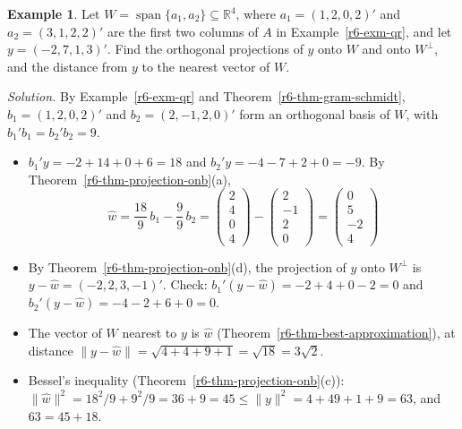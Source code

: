 \documentclass[12pt]{article}
\newcommand{\R}{\mathbb R}
\DeclareMathOperator{\Span}{span}
\theoremstyle{definition}
\newtheorem{example}[theorem]{Example}
\begin{document}
\begin{example}\label{r6-exm-projection-onb}
Let \(W=\Span\{a_1,a_2\}\subseteq\R^4\), where \(a_1=(1,2,0,2)'\) and \(a_2=(3,1,2,2)'\) are the first two columns
of \(A\) in Example~\ref{r6-exm-qr}, and let \(y=(-2,7,1,3)'\). Find the orthogonal projections of \(y\) onto
\(W\) and onto \(W^\perp\), and the distance from \(y\) to the nearest vector of \(W\).

\textit{Solution.} By Example~\ref{r6-exm-qr} and Theorem~\ref{r6-thm-gram-schmidt}, \(b_1=(1,2,0,2)'\) and
\(b_2=(2,-1,2,0)'\) form an orthogonal basis of \(W\), with \(b_1'b_1=b_2'b_2=9\).
\begin{itemize}
\item \(b_1'y=-2+14+0+6=18\) and \(b_2'y=-4-7+2+0=-9\). By Theorem~\ref{r6-thm-projection-onb}(a),
\[
\hat w=\frac{18}9\,b_1-\frac99\,b_2=\begin{pmatrix}2\\4\\0\\4\end{pmatrix}-\begin{pmatrix}2\\-1\\2\\0\end{pmatrix}
=\begin{pmatrix}0\\5\\-2\\4\end{pmatrix}
\]
\item By Theorem~\ref{r6-thm-projection-onb}(d), the projection of \(y\) onto \(W^\perp\) is
\(y-\hat w=(-2,2,3,-1)'\). Check: \(b_1'(y-\hat w)=-2+4+0-2=0\) and \(b_2'(y-\hat w)=-4-2+6+0=0\).
\item The vector of \(W\) nearest to \(y\) is \(\hat w\) (Theorem~\ref{r6-thm-best-approximation}), at distance
\(\lVert y-\hat w\rVert=\sqrt{4+4+9+1}=\sqrt{18}=3\sqrt2\).
\item Bessel's inequality (Theorem~\ref{r6-thm-projection-onb}(c)):
\(\lVert\hat w\rVert^2=18^2/9+9^2/9=36+9=45\leqslant\lVert y\rVert^2=4+49+1+9=63\), and \(63=45+18\).
\end{itemize}
\end{example}
\end{document}
